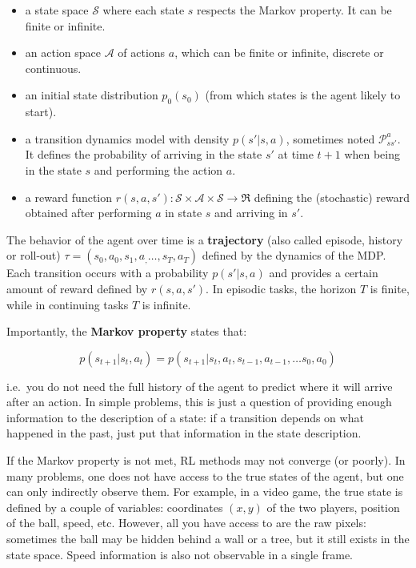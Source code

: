 \documentclass[
  letterpaper,
  DIV=11,
  numbers=noendperiod]{scrreprt}
\providecommand{\tightlist}{%
  \setlength{\itemsep}{0pt}\setlength{\parskip}{0pt}}\usepackage{longtable,booktabs,array}
\begin{document}
\begin{itemize}
\tightlist
\item
  a state space \(\mathcal{S}\) where each state \(s\) respects the
  Markov property. It can be finite or infinite.
\item
  an action space \(\mathcal{A}\) of actions \(a\), which can be finite
  or infinite, discrete or continuous.
\item
  an initial state distribution \(p_0(s_0)\) (from which states is the
  agent likely to start).
\item
  a transition dynamics model with density \(p(s'|s, a)\), sometimes
  noted \(\mathcal{P}_{ss'}^a\). It defines the probability of arriving
  in the state \(s'\) at time \(t+1\) when being in the state \(s\) and
  performing the action \(a\).
\item
  a reward function
  \(r(s, a, s') : \mathcal{S}\times\mathcal{A}\times\mathcal{S} \rightarrow \Re\)
  defining the (stochastic) reward obtained after performing \(a\) in
  state \(s\) and arriving in \(s'\).
\end{itemize}

The behavior of the agent over time is a \textbf{trajectory} (also
called episode, history or roll-out)
\(\tau = (s_0, a_0, s_1, a_, \ldots, s_T, a_T)\) defined by the dynamics
of the MDP. Each transition occurs with a probability \(p(s'|s, a)\) and
provides a certain amount of reward defined by \(r(s, a, s')\). In
episodic tasks, the horizon \(T\) is finite, while in continuing tasks
\(T\) is infinite.

Importantly, the \textbf{Markov property} states that:

\[
    p(s_{t+1}|s_t, a_t) = p(s_{t+1}|s_t, a_t, s_{t-1}, a_{t-1}, \dots s_0, a_0)
\]

i.e.~you do not need the full history of the agent to predict where it
will arrive after an action. In simple problems, this is just a question
of providing enough information to the description of a state: if a
transition depends on what happened in the past, just put that
information in the state description.

If the Markov property is not met, RL methods may not converge (or
poorly). In many problems, one does not have access to the true states
of the agent, but one can only indirectly observe them. For example, in
a video game, the true state is defined by a couple of variables:
coordinates \((x, y)\) of the two players, position of the ball, speed,
etc. However, all you have access to are the raw pixels: sometimes the
ball may be hidden behind a wall or a tree, but it still exists in the
state space. Speed information is also not observable in a single frame.
\end{document}

